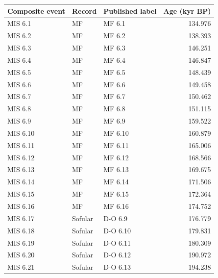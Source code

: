{\small
\centering
\begin{tabular}{lllr}
\toprule
Composite event & Record & Published label & Age (kyr BP) \\
\midrule
MIS 6.1 & MF & MF 6.1 & 134.976 \\
MIS 6.2 & MF & MF 6.2 & 138.393 \\
MIS 6.3 & MF & MF 6.3 & 146.251 \\
MIS 6.4 & MF & MF 6.4 & 146.847 \\
MIS 6.5 & MF & MF 6.5 & 148.439 \\
MIS 6.6 & MF & MF 6.6 & 149.458 \\
MIS 6.7 & MF & MF 6.7 & 150.462 \\
MIS 6.8 & MF & MF 6.8 & 151.115 \\
MIS 6.9 & MF & MF 6.9 & 159.522 \\
MIS 6.10 & MF & MF 6.10 & 160.879 \\
MIS 6.11 & MF & MF 6.11 & 165.006 \\
MIS 6.12 & MF & MF 6.12 & 168.566 \\
MIS 6.13 & MF & MF 6.13 & 169.675 \\
MIS 6.14 & MF & MF 6.14 & 171.506 \\
MIS 6.15 & MF & MF 6.15 & 172.364 \\
MIS 6.16 & MF & MF 6.16 & 174.752 \\
MIS 6.17 & Sofular & D-O 6.9 & 176.779 \\
MIS 6.18 & Sofular & D-O 6.10 & 179.831 \\
MIS 6.19 & Sofular & D-O 6.11 & 180.309 \\
MIS 6.20 & Sofular & D-O 6.12 & 190.972 \\
MIS 6.21 & Sofular & D-O 6.13 & 194.238 \\
\bottomrule
\end{tabular}
\par}
